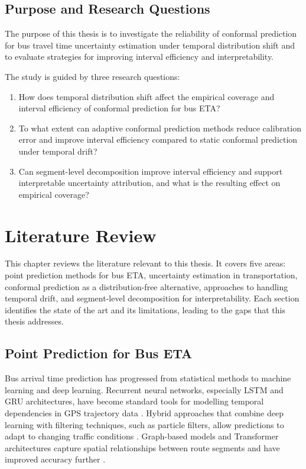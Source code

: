\documentclass[12pt, a4paper, oneside]{report}
\begin{document}
\section{Purpose and Research Questions}

The purpose of this thesis is to investigate the reliability of conformal prediction for bus travel time uncertainty estimation under temporal distribution shift and to evaluate strategies for improving interval efficiency and interpretability.

The study is guided by three research questions:

\begin{enumerate}
    \item[\textbf{RQ1:}] How does temporal distribution shift affect the empirical coverage and interval efficiency of conformal prediction for bus ETA?

    \item[\textbf{RQ2:}] To what extent can adaptive conformal prediction methods reduce calibration error and improve interval efficiency compared to static conformal prediction under temporal drift?

    \item[\textbf{RQ3:}] Can segment-level decomposition improve interval efficiency and support interpretable uncertainty attribution, and what is the resulting effect on empirical coverage?
\end{enumerate}

\chapter{Literature Review}

This chapter reviews the literature relevant to this thesis. It covers five areas: point prediction methods for bus ETA, uncertainty estimation in transportation, conformal prediction as a distribution-free alternative, approaches to handling temporal drift, and segment-level decomposition for interpretability. Each section identifies the state of the art and its limitations, leading to the gaps that this thesis addresses.

\section{Point Prediction for Bus ETA}

Bus arrival time prediction has progressed from statistical methods to machine learning and deep learning. Recurrent neural networks, especially LSTM and GRU architectures, have become standard tools for modelling temporal dependencies in GPS trajectory data \cite{Munkhbayar2025695}. Hybrid approaches that combine deep learning with filtering techniques, such as particle filters, allow predictions to adapt to changing traffic conditions \cite{An202288}. Graph-based models and Transformer architectures capture spatial relationships between route segments and have improved accuracy further \cite{Sun20201820, Lin202330384, Ma2022}.
\end{document}
